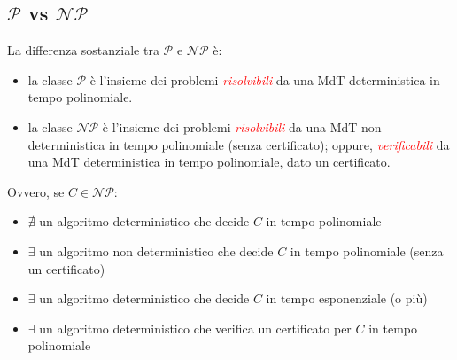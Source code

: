 \documentclass{article}  %
\theoremstyle{definition}
\begin{document}
\subsection{$\mathcal{P}$ vs $\mathcal{NP}$}
La differenza sostanziale tra $\mathcal{P}$ e $\mathcal{NP}$ è:
\begin{itemize}
	\item la classe $\mathcal{P}$ è l'insieme dei problemi \textcolor{red}{\textit{risolvibili}} da una MdT deterministica in tempo polinomiale.
	\item la classe $\mathcal{NP}$ è l'insieme dei problemi \textcolor{red}{\textit{risolvibili}} da una MdT non deterministica in tempo polinomiale (senza
	      certificato); oppure,\textcolor{red}{\textit{ verificabili}} da una MdT deterministica in tempo polinomiale, dato un certificato.
\end{itemize}
Ovvero, se $C \in \mathcal{NP}$:
\begin{itemize}
	\item $\nexists$ un algoritmo deterministico che decide $C$ in tempo polinomiale
	\item $\exists$ un algoritmo non deterministico che decide $C$ in tempo polinomiale (senza un certificato)
	\item $\exists$ un algoritmo deterministico che decide $C$ in tempo esponenziale (o più)
	\item $\exists$ un algoritmo deterministico che verifica un certificato per $C$ in tempo polinomiale
\end{itemize}
\end{document}
